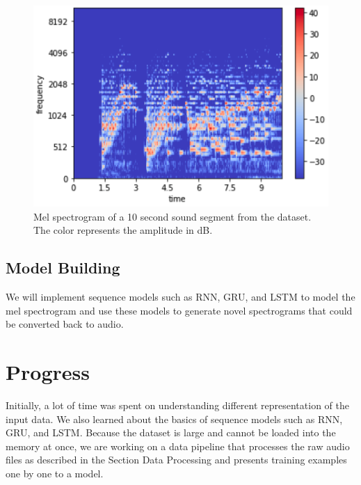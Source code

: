 \documentclass[sigconf,authorversion]{acmart}
\begin{document}
\begin{figure}[h]
  \centering
  \includegraphics[width=\linewidth]{mel_spec.png}
  \caption{Mel spectrogram of a 10 second sound segment from the dataset. The color represents the amplitude in dB.}
  \label{spectrogram}
\end{figure}

\subsection{Model Building}
We will implement sequence models such as RNN, GRU, and LSTM to model the mel spectrogram and use these models to
generate novel spectrograms that could be converted back to audio.

\section{Progress}
Initially, a lot of time was spent on understanding different representation of the input data. We also learned 
about the basics of sequence models such as RNN, GRU, and LSTM. Because the dataset is large and cannot be loaded into 
the memory at once, we are working on a data pipeline that processes the raw audio files as described in the Section 
Data Processing and presents training examples one by one to a model.



\end{document}
